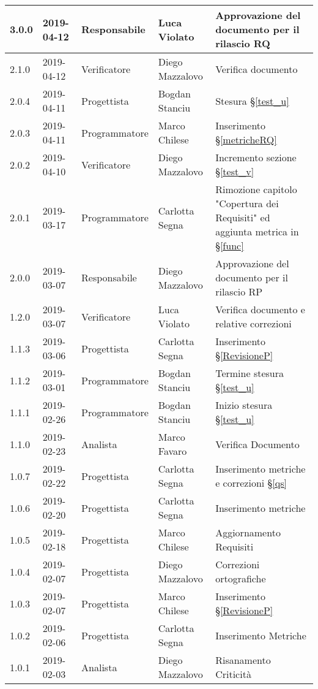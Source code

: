 \begin{center}
\begin{longtable}[c]{|m{}|m{}|m{}|m{}|p{}|}
\hline
\rowcolor{grigio}3.0.0 & 2019-04-12 & Responsabile & Luca Violato & Approvazione del documento per il rilascio RQ\\
\hline
2.1.0 & 2019-04-12 & Verificatore & Diego Mazzalovo & Verifica documento\\
\hline
\rowcolor{grigio}2.0.4 & 2019-04-11 & Progettista & Bogdan Stanciu & Stesura §\ref{test_u} \\
\hline
2.0.3 & 2019-04-11 & Programmatore & Marco Chilese & Inserimento §\ref{metricheRQ}\\
\hline
\rowcolor{grigio}2.0.2 & 2019-04-10 & Verificatore & Diego Mazzalovo & Incremento sezione §\ref{test_v}\\
\hline
2.0.1 & 2019-03-17 & Programmatore & Carlotta Segna & Rimozione capitolo "Copertura dei Requisiti" ed aggiunta metrica in  §\ref{func}\\
\hline
\rowcolor{grigio}2.0.0 & 2019-03-07 & Responsabile & Diego Mazzalovo & Approvazione del documento per il rilascio RP\\
\hline
1.2.0 & 2019-03-07 & Verificatore & Luca Violato & Verifica documento e relative correzioni\\ 
\hline
\rowcolor{grigio}1.1.3 & 2019-03-06 & Progettista & Carlotta Segna & Inserimento §\ref{RevisioneP} \\
\hline
1.1.2 & 2019-03-01 & Programmatore & Bogdan Stanciu & Termine stesura §\ref{test_u} \\
\hline
\rowcolor{grigio}1.1.1 & 2019-02-26 & Programmatore & Bogdan Stanciu & Inizio stesura §\ref{test_u} \\
\hline
1.1.0 & 2019-02-23 & Analista & Marco Favaro & Verifica Documento\\
\hline
\rowcolor{grigio} 1.0.7 & 2019-02-22 & Progettista & Carlotta Segna & Inserimento metriche e correzioni §\ref{qs}\\
\hline
1.0.6 & 2019-02-20 & Progettista & Carlotta Segna & Inserimento metriche\\
\hline
\rowcolor{grigio} 1.0.5 & 2019-02-18 & Progettista & Marco Chilese & Aggiornamento  Requisiti\\
\hline
1.0.4 & 2019-02-07 & Progettista & Diego Mazzalovo & Correzioni ortografiche \\
\hline
\rowcolor{grigio} 1.0.3 & 2019-02-07 & Progettista & Marco Chilese & Inserimento §\ref{RevisioneP} \\
\hline
1.0.2 & 2019-02-06 & Progettista & Carlotta Segna & Inserimento Metriche \\
\hline
\rowcolor{grigio}1.0.1 & 2019-02-03 & Analista & Diego Mazzalovo & Risanamento Criticità \\

\end{longtable}
\end{center}
